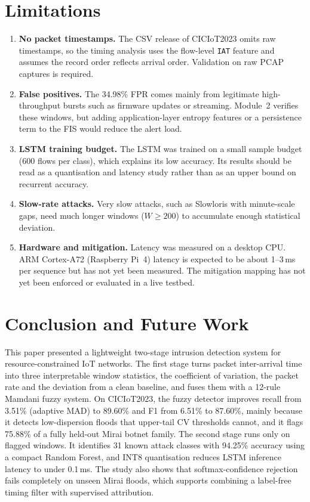 \documentclass[]{interact}
\theoremstyle{plain}
\theoremstyle{definition}
\begin{document}
\section{Limitations}\label{sec:limits}
\begin{enumerate}
  \item \textbf{No packet timestamps.} The CSV release of CICIoT2023 omits raw timestamps, so the timing analysis uses the flow-level \texttt{IAT} feature and assumes the record order reflects arrival order. Validation on raw PCAP captures is required.
  \item \textbf{False positives.} The 34.98\% FPR comes mainly from legitimate high-throughput bursts such as firmware updates or streaming. Module~2 verifies these windows, but adding application-layer entropy features or a persistence term to the FIS would reduce the alert load.
  \item \textbf{LSTM training budget.} The LSTM was trained on a small sample budget (600 flows per class), which explains its low accuracy. Its results should be read as a quantisation and latency study rather than as an upper bound on recurrent accuracy.
  \item \textbf{Slow-rate attacks.} Very slow attacks, such as Slowloris with minute-scale gaps, need much longer windows ($W\ge200$) to accumulate enough statistical deviation.
  \item \textbf{Hardware and mitigation.} Latency was measured on a desktop CPU. ARM Cortex-A72 (Raspberry Pi~4) latency is expected to be about 1--3\,ms per sequence but has not yet been measured. The mitigation mapping has not yet been enforced or evaluated in a live testbed.
\end{enumerate}

\section{Conclusion and Future Work}\label{sec:conc}
This paper presented a lightweight two-stage intrusion detection system for resource-constrained IoT networks. The first stage turns packet inter-arrival time into three interpretable window statistics, the coefficient of variation, the packet rate and the deviation from a clean baseline, and fuses them with a 12-rule Mamdani fuzzy system. On CICIoT2023, the fuzzy detector improves recall from 3.51\% (adaptive MAD) to 89.60\% and F1 from 6.51\% to 87.60\%, mainly because it detects low-dispersion floods that upper-tail CV thresholds cannot, and it flags 75.88\% of a fully held-out Mirai botnet family. The second stage runs only on flagged windows. It identifies 31 known attack classes with 94.25\% accuracy using a compact Random Forest, and INT8 quantisation reduces LSTM inference latency to under 0.1\,ms. The study also shows that softmax-confidence rejection fails completely on unseen Mirai floods, which supports combining a label-free timing filter with supervised attribution.
\end{document}
